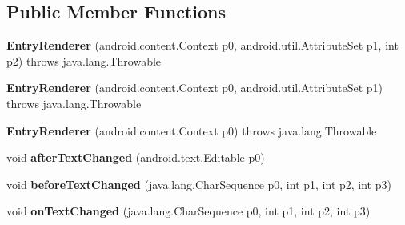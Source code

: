 \subsection*{Public Member Functions}
\begin{DoxyCompactItemize}
\item 
\mbox{\label{classmd5b60ffeb829f638581ab2bb9b1a7f4f3f_1_1EntryRenderer_ac9f1e77924196c3ec66c66643a42d20c}} 
{\bfseries Entry\+Renderer} (android.\+content.\+Context p0, android.\+util.\+Attribute\+Set p1, int p2)  throws java.\+lang.\+Throwable 	
\item 
\mbox{\label{classmd5b60ffeb829f638581ab2bb9b1a7f4f3f_1_1EntryRenderer_aa677f29384a087cba52a19f1109b3bb2}} 
{\bfseries Entry\+Renderer} (android.\+content.\+Context p0, android.\+util.\+Attribute\+Set p1)  throws java.\+lang.\+Throwable 	
\item 
\mbox{\label{classmd5b60ffeb829f638581ab2bb9b1a7f4f3f_1_1EntryRenderer_adacbe769cf67a492a9904d4fe314f4f5}} 
{\bfseries Entry\+Renderer} (android.\+content.\+Context p0)  throws java.\+lang.\+Throwable 	
\item 
\mbox{\label{classmd5b60ffeb829f638581ab2bb9b1a7f4f3f_1_1EntryRenderer_abd753a7f1a81e9767e269259f1c38e25}} 
void {\bfseries after\+Text\+Changed} (android.\+text.\+Editable p0)
\item 
\mbox{\label{classmd5b60ffeb829f638581ab2bb9b1a7f4f3f_1_1EntryRenderer_a17c929e5fb1379672df9b6b03f0b9cb4}} 
void {\bfseries before\+Text\+Changed} (java.\+lang.\+Char\+Sequence p0, int p1, int p2, int p3)
\item 
\mbox{\label{classmd5b60ffeb829f638581ab2bb9b1a7f4f3f_1_1EntryRenderer_a8f550bc686abb5ee849838c8139aa969}} 
void {\bfseries on\+Text\+Changed} (java.\+lang.\+Char\+Sequence p0, int p1, int p2, int p3)
\item 
\mbox{\label{classmd5b60ffeb829f638581ab2bb9b1a7f4f3f_1_1EntryRenderer_a099a976db3b379379d84776f7b194fed}} 

\end{DoxyCompactItemize}
